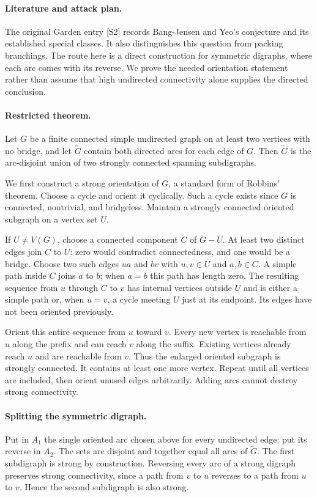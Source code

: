 \documentclass[11pt,a4paper]{article}
\begin{document}
\paragraph{Literature and attack plan.}
The original Garden entry [S2] records Bang-Jensen and Yeo's conjecture and its established special classes. It also distinguishes this question from packing branchings. The route here is a direct construction for symmetric digraphs, where each arc comes with its reverse. We prove the needed orientation statement rather than assume that high undirected connectivity alone supplies the directed conclusion.

\paragraph{Restricted theorem.}
Let $G$ be a finite connected simple undirected graph on at least two vertices with no bridge, and let $\overleftrightarrow{G}$ contain both directed arcs for each edge of $G$. Then $\overleftrightarrow{G}$ is the arc-disjoint union of two strongly connected spanning subdigraphs.

We first construct a strong orientation of $G$, a standard form of Robbins' theorem. Choose a cycle and orient it cyclically. Such a cycle exists since $G$ is connected, nontrivial, and bridgeless. Maintain a strongly connected oriented subgraph on a vertex set $U$.

If $U\ne V(G)$, choose a connected component $C$ of $G-U$. At least two distinct edges join $C$ to $U$: zero would contradict connectedness, and one would be a bridge. Choose two such edges $ua$ and $bv$ with $u,v\in U$ and $a,b\in C$. A simple path inside $C$ joins $a$ to $b$; when $a=b$ this path has length zero. The resulting sequence from $u$ through $C$ to $v$ has internal vertices outside $U$ and is either a simple path or, when $u=v$, a cycle meeting $U$ just at its endpoint. Its edges have not been oriented previously.

Orient this entire sequence from $u$ toward $v$. Every new vertex is reachable from $u$ along the prefix and can reach $v$ along the suffix. Existing vertices already reach $u$ and are reachable from $v$. Thus the enlarged oriented subgraph is strongly connected. It contains at least one more vertex. Repeat until all vertices are included, then orient unused edges arbitrarily. Adding arcs cannot destroy strong connectivity.

\paragraph{Splitting the symmetric digraph.}
Put in $A_1$ the single oriented arc chosen above for every undirected edge; put its reverse in $A_2$. The sets are disjoint and together equal all arcs of $\overleftrightarrow{G}$. The first subdigraph is strong by construction. Reversing every arc of a strong digraph preserves strong connectivity, since a path from $v$ to $u$ reverses to a path from $u$ to $v$. Hence the second subdigraph is also strong.
\end{document}
